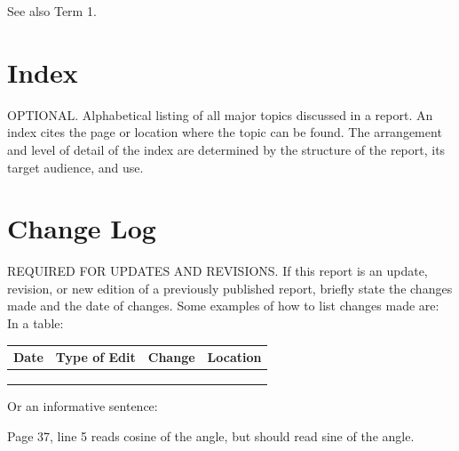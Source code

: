 \begin{appendices}
\begin{description}[leftmargin=40pt]
See also Term 1.


\end{description}

\newpage
 \tagpdfparaOff {}
\section{Index}
\label{app:index}
\tagmcend
 \tagstructend
 \tagpdfparaOn
OPTIONAL. Alphabetical listing of all major topics discussed in a report. An index cites the page or location where the topic can be found. The arrangement and level of detail of the index are determined by the structure of the report, its target audience, and use.

\newpage
  \tagpdfparaOff {}
\section{Change Log}
\label{app:log}
\tagmcend
 \tagstructend
 \tagpdfparaOn
REQUIRED FOR UPDATES AND REVISIONS. If this report is an update, revision, or new edition of a previously published report, briefly state the changes made and the date of changes. Some examples of how to list changes made are: \\

In a table: 
\begin{table}[H]
\tagpdfparaOff {}
\begin{tabular}{|l|l|l|l|}
\hline
Date & Type of Edit & Change & Location \\ \hline
     &              &        &          \\ \hline
     &              &        &          \\ \hline
     &              &        &          \\ \hline
\end{tabular}
\tagstructend
 \tagmcend
\end{table}
\tagpdfparaOn
Or an informative sentence:

\begin{tcolorbox}%
Page 37, line 5 reads cosine of the angle, but should read sine of the angle.
\end{tcolorbox}
\tagmcend
\tagstructend


\end{appendices}
